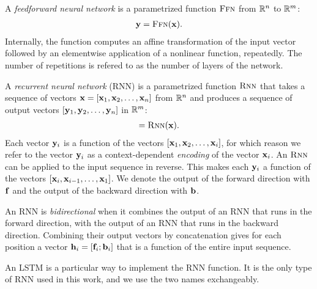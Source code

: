   \begin{definition}{} A \textit{feedforward neural network} is a parametrized function $\textsc{Ffn}$ from $\mathbb{R}^{n}$ to $\mathbb{R}^{m}$:
  \begin{align*}
    \mathbf{y} = \textsc{Ffn}( \mathbf{x} ).
  \end{align*}
  Internally, the function computes an affine transformation of the input vector followed by an elementwise application of a nonlinear function, repeatedly. The number of repetitions is refered to as the number of layers of the network.
  \end{definition}

  \begin{definition}{} A \textit{recurrent neural network} (RNN) is a parametrized function $\textsc{Rnn}$ that takes a sequence of vectors $\mathbf{x} = [ \mathbf{x}_1, \mathbf{x}_2, \dots, \mathbf{x}_n ]$ from $\mathbb{R}^{n}$ and produces a sequence of output vectors $[\mathbf{y}_1, \mathbf{y}_2, \dots,\mathbf{y}_n]$ in $\mathbb{R}^{m}$:
  \begin{align*}
    [\vecy_1, \vecy_2, \dots, \vecy_n] = \rnn( \vecx ).
  \end{align*}
  Each vector $\mathbf{y}_i$ is a function of the vectors $[\mathbf{x}_1, \mathbf{x}_2, \dots, \mathbf{x}_i ]$, for which reason we refer to the vector $\mathbf{y}_i$ as a context-dependent \textit{encoding} of the vector $\mathbf{x}_i$. An $\textsc{Rnn}$ can be applied to the input sequence in reverse. This makes each $\mathbf{y}_i$ a function of the vectors $[\mathbf{x}_i, \mathbf{x}_{i-1}, \dots, \mathbf{x}_1 ]$. We denote the output of the forward direction with $\mathbf{f}$ and the output of the backward direction with $\mathbf{b}$.
  \end{definition}

  \begin{definition}{} An RNN is \textit{bidirectional} when it combines the output of an RNN that runs in the forward direction, with the output of an RNN that  runs in the backward direction. Combining their output vectors by concatenation gives for each position a vector $\mathbf{h}_i = [ \mathbf{f}_i; \mathbf{b}_i ]$ that is a function of the entire input sequence.
  \end{definition}

  \begin{definition}{} An LSTM \citep{hochreiter1997long} is a particular way to implement the RNN function. It is the only type of RNN used in this work, and we use the two names exchangeably.
  \end{definition}

